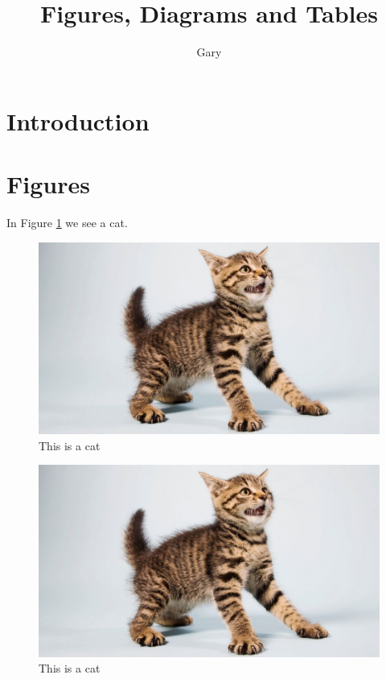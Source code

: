 \documentclass[a4paper, twocolumn]{article}
\title{Figures, Diagrams and Tables}
\author{Gary}
\begin{document}
\maketitle	

\begin{abstract}
	\lipsum[1]
\end{abstract}

\tableofcontents

\section{Introduction}
\lipsum[1-5]

\section{Figures}\label{sect:figures}
In Figure \ref{fig:cat} we see a cat. 

\lipsum[1-3]

\begin{figure}[tbp]
	\includegraphics[width=\linewidth]{Figures/cat}
	\caption{This is a cat}
	\label{fig:cat}
\end{figure}


\begin{figure}[tbp]
	\includegraphics[width=\linewidth]{Figures/cat}
	\caption{This is a cat}
	\label{fig:big_cat}
\end{figure}
\end{document}

